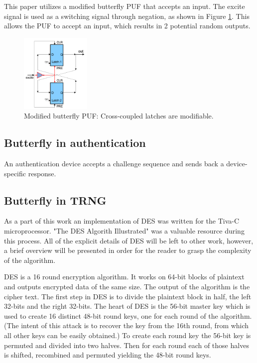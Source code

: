 	This paper utilizes a modified butterfly PUF that accepts an input. The excite signal is used as a switching signal through negation, as shown in Figure \ref{fig:bfly2}. This allows the PUF to accept an input, which results in 2 potential random outputs. 
		\begin{figure}[tbph]
			\centering
			\includegraphics[width=0.3\textwidth]{bfly2.png}
			\caption{Modified butterfly PUF: Cross-coupled latches are modifiable.}\label{fig:bfly2}
		\end{figure}
	

	\subsection{Butterfly in authentication}
		An authentication device accepts a challenge sequence and sends back a device-specific response.  
				

	\subsection{Butterfly in TRNG}
	As a part of this work an implementation of DES was written for the Tiva-C microprocessor.  "The DES Algorith Illustrated" was a valuable resource during this process.  All of the explicit details of DES will be left to other work, however, a brief overview will be presented in order for the reader to grasp the complexity of the algorithm. 

	DES is a 16 round encryption algorithm.  It works on 64-bit blocks of plaintext and outputs encrypted data of the same size.  The output of the algorithm is the cipher text.  The first step in DES is to divide the plaintext block in half, the left 32-bits and the right 32-bits.  The heart of DES is the 56-bit master key which is used to create 16 distinct 48-bit round keys, one for each round of the algorithm.  (The intent of this attack is to recover the key from the 16th round, from which all other keys can be easily obtained.)  To create each round key the 56-bit key is permuted and divided into two halves.  Then for each round each of those halves is shifted, recombined and permuted yielding the 48-bit round keys.


